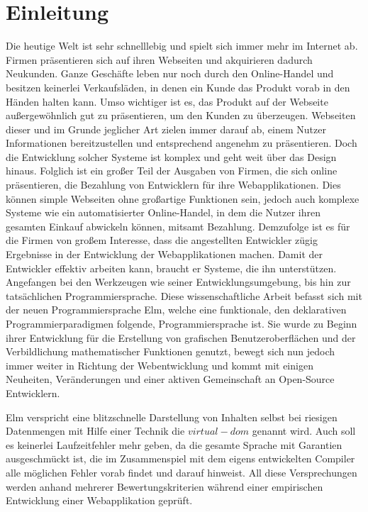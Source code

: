 \chapter{Einleitung}
\label{sec:einleitung}
Die heutige Welt ist sehr schnelllebig und spielt sich immer mehr im Internet ab. Firmen präsentieren sich auf ihren Webseiten und akquirieren dadurch Neukunden. Ganze Geschäfte leben nur noch durch den Online-Handel und besitzen keinerlei Verkaufsläden, in denen ein Kunde das Produkt vorab in den Händen halten kann. Umso wichtiger ist es, das Produkt auf der Webseite außergewöhnlich gut zu präsentieren, um den Kunden zu überzeugen. Webseiten dieser und im Grunde jeglicher Art zielen immer darauf ab, einem Nutzer Informationen bereitzustellen und entsprechend angenehm zu präsentieren. Doch die Entwicklung solcher Systeme ist komplex und geht weit über das Design hinaus. Folglich ist ein großer Teil der Ausgaben von Firmen, die sich online präsentieren, die Bezahlung von Entwicklern für ihre Webapplikationen. Dies können simple Webseiten ohne großartige Funktionen sein, jedoch auch komplexe Systeme wie ein automatisierter Online-Handel, in dem die Nutzer ihren gesamten Einkauf abwickeln können, mitsamt Bezahlung. Demzufolge ist es für die Firmen von großem Interesse, dass die angestellten Entwickler zügig Ergebnisse in der Entwicklung der Webapplikationen machen. Damit der Entwickler effektiv arbeiten kann, braucht er Systeme, die ihn unterstützen. Angefangen bei den Werkzeugen wie seiner Entwicklungsumgebung, bis hin zur tatsächlichen Programmiersprache. Diese wissenschaftliche Arbeit befasst sich mit der neuen Programmiersprache Elm, welche eine funktionale, den deklarativen Programmierparadigmen folgende, Programmiersprache ist. Sie wurde zu Beginn ihrer Entwicklung für die Erstellung von grafischen Benutzeroberflächen und der Verbildlichung mathematischer Funktionen genutzt, bewegt sich nun jedoch immer weiter in Richtung der Webentwicklung und kommt mit einigen Neuheiten, Veränderungen und einer aktiven Gemeinschaft an Open-Source Entwicklern.

Elm verspricht eine blitzschnelle Darstellung von Inhalten selbst bei riesigen Datenmengen mit Hilfe einer Technik die $virtual-dom$ genannt wird. Auch soll es keinerlei Laufzeitfehler mehr geben, da die gesamte Sprache mit Garantien ausgeschmückt ist, die im Zusammenspiel mit dem eigens entwickelten Compiler alle möglichen Fehler vorab findet und darauf hinweist.
All diese Versprechungen werden anhand mehrerer Bewertungskriterien während einer empirischen Entwicklung einer Webapplikation geprüft.